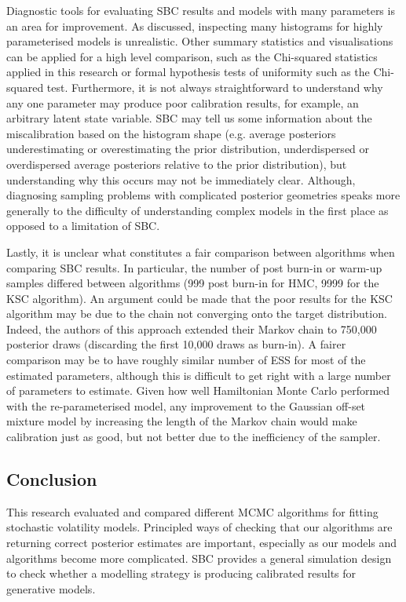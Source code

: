 \documentclass[12pt, a4paper]{article}
\begin{document}
Diagnostic tools for evaluating SBC results and models with many parameters is an area for improvement. As discussed, inspecting many histograms for highly parameterised models is unrealistic. Other summary statistics and visualisations can be applied for a high level comparison, such as the Chi-squared statistics applied in this research or formal hypothesis tests of uniformity such as the Chi-squared test. Furthermore, it is not always straightforward to understand why any one parameter may produce poor calibration results, for example, an arbitrary latent state variable. SBC may tell us some information about the miscalibration based on the histogram shape (e.g. average posteriors underestimating or overestimating the prior distribution, underdispersed or overdispersed average posteriors relative to the prior distribution), but understanding why this occurs may not be immediately clear. Although, diagnosing sampling problems with complicated posterior geometries speaks more generally to the difficulty of understanding complex models in the first place as opposed to a limitation of SBC.

Lastly, it is unclear what constitutes a fair comparison between algorithms when comparing SBC results. In particular, the number of post burn-in or warm-up samples differed between algorithms (999 post burn-in for HMC, 9999 for the KSC algorithm). An argument could be made that the poor results for the KSC algorithm may be due to the chain not converging onto the target distribution. Indeed, the authors of this approach extended their Markov chain to 750,000 posterior draws (discarding the first 10,000 draws as burn-in). A fairer comparison may be to have roughly similar number of ESS for most of the estimated parameters, although this is difficult to get right with a large number of parameters to estimate. Given how well Hamiltonian Monte Carlo performed with the re-parameterised model, any improvement to the Gaussian off-set mixture model by increasing the length of the Markov chain would make calibration just as good, but not better due to the inefficiency of the sampler. 

\subsection{Conclusion}
This research evaluated and compared different MCMC algorithms for fitting stochastic volatility models. Principled ways of checking that our algorithms are returning correct posterior estimates are important, especially as our models and algorithms become more complicated. SBC provides a general simulation design to check whether a modelling strategy is producing calibrated results for generative models.
\end{document}
